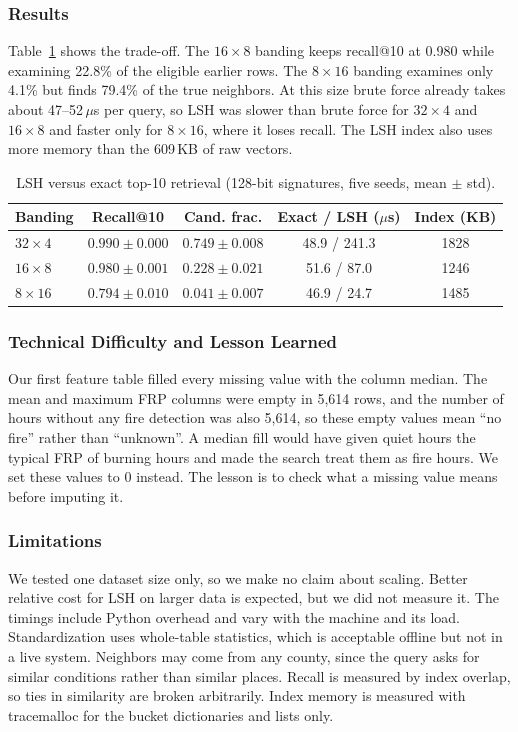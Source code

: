 \subsubsection{Results}
Table~\ref{tab:lsh} shows the trade-off. The $16\times8$ banding keeps recall@10 at 0.980 while examining 22.8\% of the eligible earlier rows. The $8\times16$ banding examines only 4.1\% but finds 79.4\% of the true neighbors. At this size brute force already takes about 47--52\,$\mu$s per query, so LSH was slower than brute force for $32\times4$ and $16\times8$ and faster only for $8\times16$, where it loses recall. The LSH index also uses more memory than the 609\,KB of raw vectors.

\begin{table}[t]
\caption{LSH versus exact top-10 retrieval (128-bit signatures, five seeds, mean $\pm$ std).}
\label{tab:lsh}
\centering\small
\begin{tabular}{lcccc}
\hline
Banding & Recall@10 & Cand. frac. & Exact / LSH ($\mu$s) & Index (KB)\\
\hline
$32\times4$ & $0.990\pm0.000$ & $0.749\pm0.008$ & 48.9 / 241.3 & 1828\\
$16\times8$ & $0.980\pm0.001$ & $0.228\pm0.021$ & 51.6 / 87.0 & 1246\\
$8\times16$ & $0.794\pm0.010$ & $0.041\pm0.007$ & 46.9 / 24.7 & 1485\\
\hline
\end{tabular}
\end{table}

\subsubsection{Technical Difficulty and Lesson Learned}
Our first feature table filled every missing value with the column median. The mean and maximum FRP columns were empty in 5{,}614 rows, and the number of hours without any fire detection was also 5{,}614, so these empty values mean ``no fire'' rather than ``unknown''. A median fill would have given quiet hours the typical FRP of burning hours and made the search treat them as fire hours. We set these values to 0 instead. The lesson is to check what a missing value means before imputing it.

\subsubsection{Limitations}
We tested one dataset size only, so we make no claim about scaling. Better relative cost for LSH on larger data is expected, but we did not measure it. The timings include Python overhead and vary with the machine and its load. Standardization uses whole-table statistics, which is acceptable offline but not in a live system. Neighbors may come from any county, since the query asks for similar conditions rather than similar places. Recall is measured by index overlap, so ties in similarity are broken arbitrarily. Index memory is measured with tracemalloc for the bucket dictionaries and lists only.
